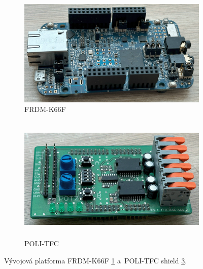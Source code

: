 \begin{figure}[h]
    \begin{subfigure}{0.45\textwidth}
        \includegraphics[width=\textwidth]{Figures/FRDM-K66F.png} 
        \caption{FRDM-K66F}
        \label{fig:FRDM-K66F}
    \end{subfigure}
    \hfill
    \begin{subfigure}{0.48\textwidth}
    \includegraphics[width=0.9\linewidth, height=6cm]{Figures/POLI-TFC.png}
    \caption{POLI-TFC}
    \label{fig:POLI-TFC}
\end{subfigure}

    \caption{Vývojová platforma FRDM-K66F \ref{fig:FRDM-K66F} a~POLI-TFC shield \ref{fig:POLI-TFC}.}
\end{figure}

\endinput
